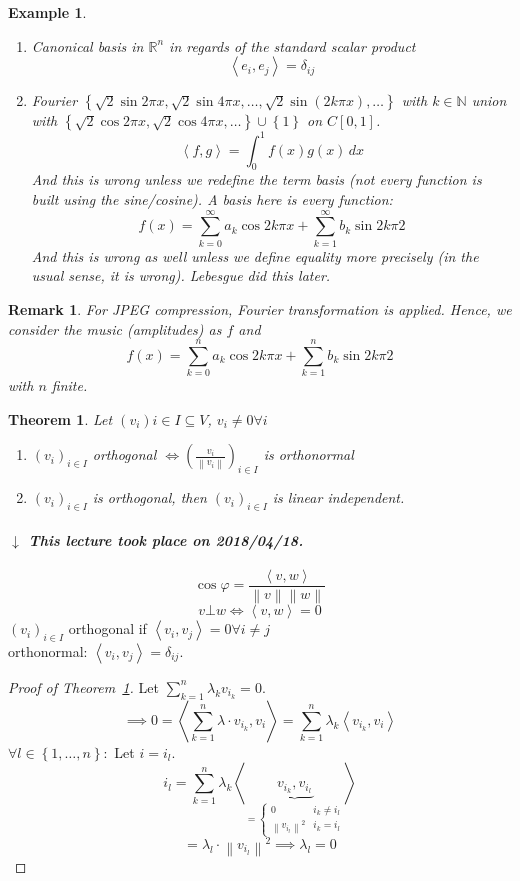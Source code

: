 \documentclass{article}
\newcounter{lecref}[section]
\numberwithin{lecref}{section}
\newtheorem{theorem}[lecref]{Theorem}
\newtheorem{example}[lecref]{Example}
\newtheorem{remark}[lecref]{Remark}
\newcommand{\set}[1]{\left\{#1\right\}}
\newcommand{\ip}[2]{\left\langle#1,#2\right\rangle} %
\newcommand{\angel}[1]{\left\langle#1\right\rangle}
\newcommand{\norm}[1]{\left\|#1\right\|}
\newcommand{\dateref}[1]{%
  \begin{mdframed}[backgroundcolor=gray!10,innerbottommargin=0pt,innertopmargin=0pt]
    \paragraph{\textit{$\downarrow$ This lecture took place on #1.}}%
  \end{mdframed}%
}
\begin{document}
\begin{example} %
  \begin{enumerate}
    \item Canonical basis in $\mathbb R^n$ in regards of the standard scalar product
      \[ \ip{e_i}{e_j} = \delta_{ij} \]
    \item Fourier $\set{\sqrt 2 \sin{2\pi x}, \sqrt2 \sin{4\pi x}, \ldots, \sqrt2 \sin(2k \pi x), \ldots}$ with $k \in \mathbb N$
      union with $\set{\sqrt2 \cos{2\pi x}, \sqrt2 \cos{4\pi x}, \ldots} \cup \set{\mathfrak 1}$
      on $C[0,1]$.
      \[ \ip fg = \int_0^1 f(x) g(x) \, dx \]
      And this is wrong unless we redefine the term basis (not every function is built using the sine/cosine).
      A basis here is every function:
      \[ f(x) = \sum_{k=0}^\infty a_k \cos{2k \pi x} + \sum_{k=1}^\infty b_k \sin{2k \pi 2} \]
      And this is wrong as well unless we define equality more precisely (in the usual sense, it is wrong).
      Lebesgue did this later.
  \end{enumerate}
\end{example}

\begin{remark}
  For JPEG compression, Fourier transformation is applied. Hence, we consider
  the music (amplitudes) as $f$ and
  \[ f(x) = \sum_{k=0}^n a_k \cos{2k \pi x} + \sum_{k=1}^n b_k \sin{2k \pi 2} \]
  with $n$ finite.
\end{remark}

\begin{theorem} %
  \label{thm838}
  Let $(v_i){i \in I} \subseteq V$, $v_i \neq 0 \forall i$
  \begin{enumerate}
    \item $(v_i)_{i \in I}$ orthogonal $\iff \left(\frac{v_i}{\norm{v_i}}\right)_{i \in I}$ is orthonormal
    \item $(v_i)_{i \in I}$ is orthogonal, then $(v_i)_{i \in I}$ is linear independent.
  \end{enumerate}
\end{theorem}

\dateref{2018/04/18}

\[ \cos\varphi = \frac{\ip vw}{\norm{v} \norm{w}} \]
\[ v \bot w \iff \ip vw = 0 \]
$(v_i)_{i \in I}$ orthogonal if $\ip{v_i}{v_j} = 0 \forall i \neq j$ \\
orthonormal: $\ip{v_i}{v_j} = \delta_{ij}$.

\begin{proof}[Proof of Theorem~\ref{thm838}]
  Let $\sum_{k=1}^n \lambda_k v_{i_k} = 0$.
  \[ \implies 0 = \angel{\sum_{k=1}^n \lambda \cdot v_{i_k}, v_i} = \sum_{k=1}^n \lambda_k \angel{v_{i_k}, v_i} \]
  $\forall l \in \set{1, \ldots, n}:$ Let $i = i_l$.
  \[ i_l = \sum_{k=1}^n \lambda_k \angel{\underbrace{v_{i_k}, v_{i_l}}_{= \begin{cases} 0 & i_k \neq i_l \\ \norm{v_{i_l}}^2 & i_k = i_l \end{cases}} } \]
  \[ = \lambda_l \cdot \norm{v_{i_l}}^2 \implies \lambda_l = 0 \]
\end{proof}
\end{document}
